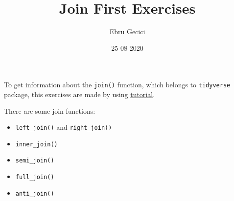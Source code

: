 \documentclass[
]{article}
\title{Join First Exercises}
\author{Ebru Gecici}
\date{25 08 2020}
\begin{document}
\maketitle

{
\setcounter{tocdepth}{3}
\tableofcontents
}
To get information about the \texttt{join()} function, which belongs to
\texttt{tidyverse} package, this exercises are made by using
\href{https://stat545.com/join-cheatsheet.html}{tutorial}.

There are some join functions:

\begin{itemize}
\item
  \texttt{left\_join()} and \texttt{right\_join()}
\item
  \texttt{inner\_join()}
\item
  \texttt{semi\_join()}
\item
  \texttt{full\_join()}
\item
  \texttt{anti\_join()}
\end{itemize}
\end{document}
